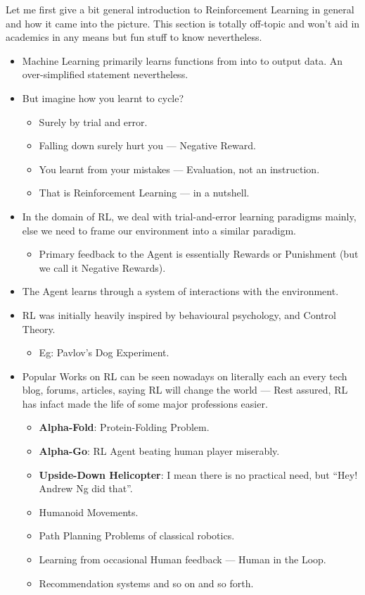 Let me first give a bit general introduction to Reinforcement Learning in general and how it came into the picture. This section is totally off-topic and won't aid in academics in any means but fun stuff to know nevertheless.

\begin{itemize}[leftmargin=*]
    \item Machine Learning primarily learns functions from into to output data. An over-simplified statement nevertheless.
    \item But imagine how you learnt to cycle?
    \begin{itemize}
        \item Surely by trial and error.
        \item Falling down surely hurt you --- Negative Reward.
        \item You learnt from your mistakes --- Evaluation, not an instruction.
        \item That is Reinforcement Learning --- in a nutshell.
    \end{itemize}
    \item In the domain of RL, we deal with trial-and-error learning paradigms mainly, else we need to frame our environment into a similar paradigm.
    \begin{itemize}
        \item Primary feedback to the Agent is essentially Rewards or Punishment (but we call it Negative Rewards).
    \end{itemize}
    \item The Agent learns through a system of interactions with the environment.
    \item RL was initially heavily inspired by behavioural psychology, and Control Theory.
    \begin{itemize}
        \item Eg: Pavlov's Dog Experiment.
    \end{itemize}
    \item Popular Works on RL can be seen nowadays on literally each an every tech blog, forums, articles, saying RL will change the world --- Rest assured, RL has infact made the life of some major professions easier.
    \begin{itemize}
        \item \textbf{Alpha-Fold}: Protein-Folding Problem.
        \item \textbf{Alpha-Go}: RL Agent beating human player miserably.
        \item \textbf{Upside-Down Helicopter}: I mean there is no practical need, but ``Hey! Andrew Ng did that''.
        \item Humanoid Movements.
        \item Path Planning Problems of classical robotics.
        \item Learning from occasional Human feedback --- Human in the Loop.
        \item Recommendation systems and so on and so forth.
    \end{itemize}
\end{itemize}
